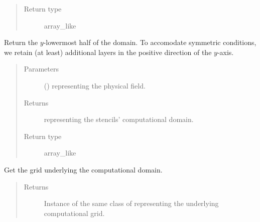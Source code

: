 \documentclass[letterpaper,10pt,english]{sphinxmanual}
\begin{document}
\begin{fulllineitems}
\begin{fulllineitems}
\begin{quote}
\begin{description}
\item[{Return type}] \leavevmode
array\_like

\end{description}\end{quote}

\end{fulllineitems}


\begin{fulllineitems}
\label{\detokenize{api:dycore.horizontal_boundary_relaxed.RelaxedSymmetricXZ.from_physical_to_computational_domain}}
Return the \(y\)-lowermost half of the domain. To accomodate symmetric conditions,
we retain (at least)  additional layers in the positive direction of the \(y\)-axis.
\begin{quote}\begin{description}
\item[{Parameters}] \leavevmode
{} () \textendash{}  representing the physical field.

\item[{Returns}] \leavevmode
{} representing the stencils’ computational domain.

\item[{Return type}] \leavevmode
array\_like

\end{description}\end{quote}

\end{fulllineitems}


\begin{fulllineitems}
\label{\detokenize{api:dycore.horizontal_boundary_relaxed.RelaxedSymmetricXZ.get_computational_grid}}
Get the  grid underlying the computational domain.
\begin{quote}\begin{description}
\item[{Returns}] \leavevmode
Instance of the same class of 
representing the underlying computational grid.


\end{description}
\end{quote}
\end{fulllineitems}
\end{fulllineitems}
\end{document}
